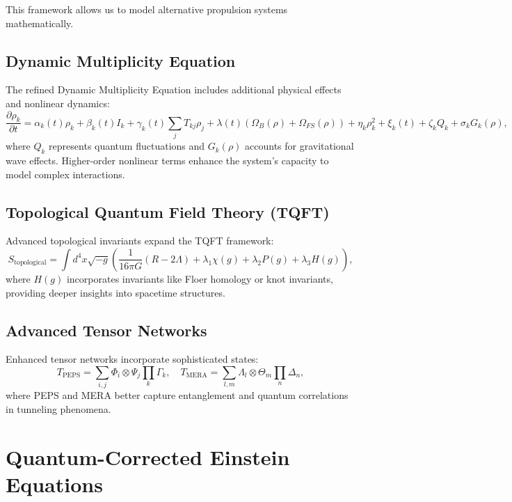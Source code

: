\documentclass[12]{amsart}
\theoremstyle{plain}
\begin{document}
This framework allows us to model alternative propulsion systems mathematically.

\subsection{Dynamic Multiplicity Equation}
The refined Dynamic Multiplicity Equation includes additional physical effects and nonlinear dynamics:
\begin{equation}
\frac{\partial \rho_k}{\partial t} = \alpha_k(t)\rho_k + \beta_k(t)I_k + \gamma_k(t) \sum_j T_{kj}\rho_j + \lambda(t)(\Omega_B(\rho) + \Omega_{FS}(\rho)) + \eta_k\rho_k^2 + \xi_k(t) + \zeta_k Q_k + \sigma_k G_k(\rho),
\end{equation}
where $Q_k$ represents quantum fluctuations and $G_k(\rho)$ accounts for gravitational wave effects. Higher-order nonlinear terms enhance the system's capacity to model complex interactions.

\subsection{Topological Quantum Field Theory (TQFT)}
Advanced topological invariants expand the TQFT framework:
\begin{equation}
S_{\text{topological}} = \int d^4x \sqrt{-g} \left( \frac{1}{16\pi G}(R - 2\Lambda) + \lambda_1 \chi(g) + \lambda_2 P(g) + \lambda_3 H(g) \right),
\end{equation}
where $H(g)$ incorporates invariants like Floer homology or knot invariants, providing deeper insights into spacetime structures.

\subsection{Advanced Tensor Networks}
Enhanced tensor networks incorporate sophisticated states:
\begin{equation}
T_{\text{PEPS}} = \sum_{i,j} \Phi_i \otimes \Psi_j \prod_{k} \Gamma_k, \quad T_{\text{MERA}} = \sum_{l,m} \Lambda_l \otimes \Theta_m \prod_{n} \Delta_n,
\end{equation}
where PEPS and MERA better capture entanglement and quantum correlations in tunneling phenomena.

\newpage

\section{Quantum-Corrected Einstein Equations}
\end{document}
